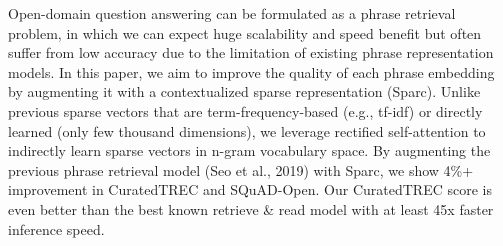 Open-domain question answering can be formulated as a phrase retrieval problem, in which we can expect huge scalability and speed benefit but often suffer from low accuracy due to the limitation of existing phrase representation models. In this paper, we aim to improve the quality of each phrase embedding by augmenting it with a contextualized sparse representation (Sparc). Unlike previous sparse vectors that are term-frequency-based (e.g., tf-idf) or directly learned (only few thousand dimensions), we leverage rectified self-attention to indirectly learn sparse vectors in n-gram vocabulary space. By augmenting the previous phrase retrieval model (Seo et al., 2019) with Sparc, we show 4\%+ improvement in CuratedTREC and SQuAD-Open. Our CuratedTREC score is even better than the best known retrieve \& read model with at least 45x faster inference speed.
